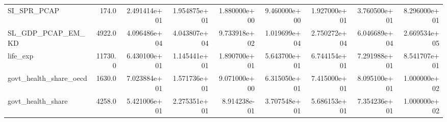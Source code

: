 \begin{tabular}{lrrrrrrrr}
SI\_SPR\_PCAP & 174.0 & 2.491414e+01 & 1.954875e+01 & 1.880000e+00 & 9.460000e+00 & 1.927000e+01 & 3.760500e+01 & 8.296000e+01 \\
SL\_GDP\_PCAP\_EM\_KD & 4922.0 & 4.096486e+04 & 4.043807e+04 & 9.733918e+02 & 1.019699e+04 & 2.750272e+04 & 6.046689e+04 & 2.669534e+05 \\
life\_exp & 11730.0 & 6.430100e+01 & 1.145441e+01 & 1.890700e+01 & 5.643700e+01 & 6.744154e+01 & 7.291988e+01 & 8.541707e+01 \\
govt\_health\_share\_oecd & 1630.0 & 7.023884e+01 & 1.571736e+01 & 9.071000e+00 & 6.315050e+01 & 7.415000e+01 & 8.095100e+01 & 1.000000e+02 \\
govt\_health\_share & 4258.0 & 5.421006e+01 & 2.275351e+01 & 8.914238e-01 & 3.707548e+01 & 5.686153e+01 & 7.354236e+01 & 1.000000e+02 \\
\bottomrule
\end{tabular}
